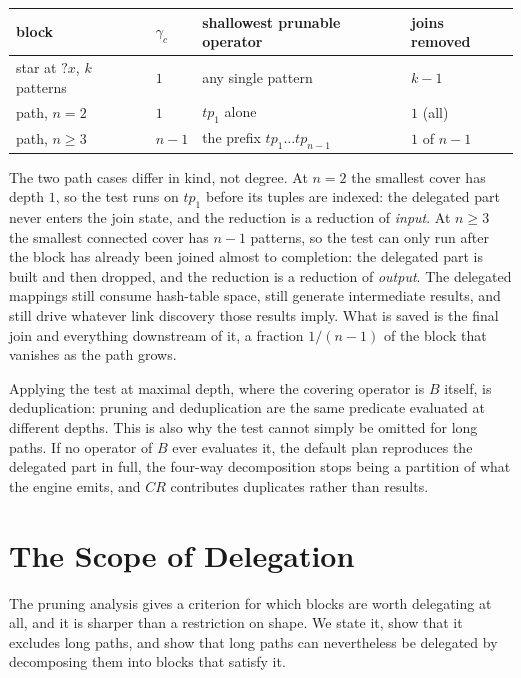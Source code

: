 \documentclass{article}
\begin{document}
\begin{center}
\begin{tabular}{llll}
\toprule
block & $\gamma_c$ & shallowest prunable operator & joins removed \\
\midrule
star at $?x$, $k$ patterns & $1$   & any single pattern               & $k - 1$ \\
path, $n = 2$              & $1$   & $tp_1$ alone                     & $1$ (all) \\
path, $n \geq 3$           & $n-1$ & the prefix $tp_1 \dots tp_{n-1}$ & $1$ of $n-1$ \\
\bottomrule
\end{tabular}
\end{center}

The two path cases differ in kind, not degree. At $n = 2$ the smallest cover has depth
$1$, so the test runs on $tp_1$ before its tuples are indexed: the delegated part never
enters the join state, and the reduction is a reduction of \emph{input}. At $n \geq 3$
the smallest connected cover has $n - 1$ patterns, so the test can only run after the
block has already been joined almost to completion: the delegated part is built and then
dropped, and the reduction is a reduction of \emph{output}. The delegated mappings still
consume hash-table space, still generate intermediate results, and still drive whatever
link discovery those results imply. What is saved is the final join and everything
downstream of it, a fraction $1/(n-1)$ of the block that vanishes as the path grows.

Applying the test at maximal depth, where the covering operator is $B$ itself, is
deduplication: pruning and deduplication are the same predicate evaluated at different
depths. This is also why the test cannot simply be omitted for long paths. If no
operator of $B$ ever evaluates it, the default plan reproduces the delegated part in
full, the four-way decomposition stops being a partition of what the engine emits, and
$CR$ contributes duplicates rather than results.

\section{The Scope of Delegation}

The pruning analysis gives a criterion for which blocks are worth delegating at all, and
it is sharper than a restriction on shape. We state it, show that it excludes long paths,
and show that long paths can nevertheless be delegated by decomposing them into blocks
that satisfy it.
\end{document}
